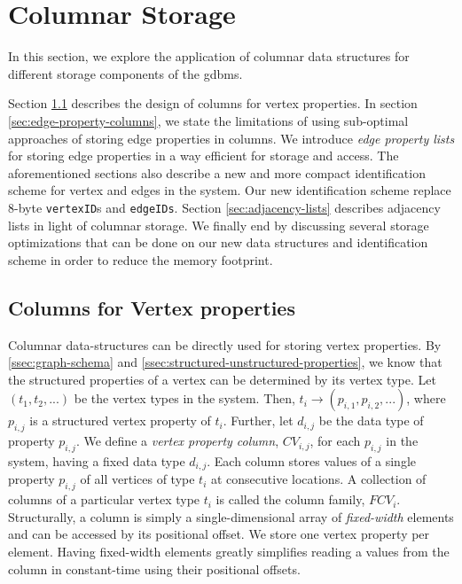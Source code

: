 \chapter{Columnar Storage}
\label{c:columnar-storage}

In this section, we explore the application of columnar data structures for different storage components of the \gls{gdbms}. 

Section \ref{sec:vertex-property-columns} describes the design of columns for vertex properties. In section \ref{sec:edge-property-columns}, we state the limitations of using sub-optimal approaches of storing edge properties in columns. We introduce \emph{edge property lists} for storing edge properties in a way efficient for storage and access. The aforementioned sections also describe a new and more compact identification scheme for vertex and edges in the system. Our new identification scheme replace 8-byte \texttt{vertexID}s and \texttt{edgeIDs}. Section \ref{sec:adjacency-lists} describes adjacency lists in light of columnar storage. We finally end by discussing several storage optimizations that can be done on our new data structures and identification scheme in order to reduce the memory footprint.

\section{Columns for Vertex properties}
\label{sec:vertex-property-columns}

Columnar data-structures can be directly used for storing vertex properties. By  \ref{ssec:graph-schema} and \ref{ssec:structured-unstructured-properties}, we know that the structured properties of a vertex can be determined by its vertex type. Let $(t_1, t_2, ...)$ be the vertex types in the system. Then, $t_i \rightarrow (p_{i,1},  p_{i,2}, ...)$, where $p_{i, j}$ is a structured vertex property of $t_i$. Further, let $d_{i,j}$ be the data type of property $p_{i,j}$. We define a \emph{vertex property column}, $CV_{i,j}$, for each $p_{i,j}$ in the system, having a fixed data type $d_{i,j}$. Each column stores values of a single property $p_{i,j}$ of all vertices of type $t_i$ at consecutive locations. A collection of columns of a particular vertex type $t_i$ is called the column family, $FCV_i$. Structurally, a column is simply a single-dimensional array of \emph{fixed-width} elements and can be accessed by its positional offset. We store one vertex property per element. Having fixed-width elements greatly simplifies reading a values from the column in constant-time using their positional offsets.

